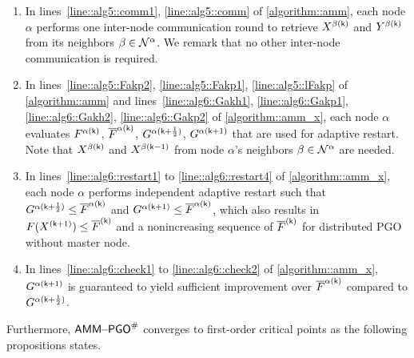 \begin{enumerate}[leftmargin=0.45cm]
	
\item In lines~\ref{line::alg5::comm1}, \ref{line::alg5::comm} of \cref{algorithm::amm}, each node $\alpha$ performs one inter-node communication round to retrieve $X^{\beta(\mathsf{k})}$ and $Y^{\beta(\mathsf{k})}$ from its neighbors $\beta\in\mathcal{N}^\alpha$. We remark that no other inter-node communication is required.

\item In lines~\ref{line::alg5::Fakp2}, \ref{line::alg5::Fakp1}, \ref{line::alg5::lFakp} of \cref{algorithm::amm} and lines~\ref{line::alg6::Gakh1}, \ref{line::alg6::Gakp1}, \ref{line::alg6::Gakh2}, \ref{line::alg6::Gakp2} of \cref{algorithm::amm_x}, each node $\alpha$  evaluates $F^{\alpha(\mathsf{k})}$, $\overline{F}^{\alpha(\mathsf{k})}$, $G^{\alpha(\mathsf{k}+\frac{1}{2})}$, $G^{\alpha(\mathsf{k}+1)}$ that are used for adaptive restart. Note that $X^{\beta(\mathsf{k})}$ and $X^{\beta(\mathsf{k}-1)}$ from node $\alpha$'s neighbors  $\beta\in\mathcal{N}^\alpha$ are needed.

\item In lines~\ref{line::alg6::restart1} to \ref{line::alg6::restart4} of \cref{algorithm::amm_x}, each node $\alpha$ performs independent adaptive restart such that $G^{\alpha(\mathsf{k}+\frac{1}{2})}\leq \overline{F}^{\alpha(\mathsf{k})}$ and $G^{\alpha(\mathsf{k}+1)}\leq \overline{F}^{\alpha(\mathsf{k})}$, which also results in $F(X^{(\mathsf{k}+1)})\leq \overline{F}^{(\mathsf{k})}$ and a nonincreasing sequence of $\overline{F}^{(\mathsf{k})}$ for distributed PGO without master node. 
\item In lines~\ref{line::alg6::check1} to \ref{line::alg6::check2} of \cref{algorithm::amm_x}, $G^{\alpha(\mathsf{k}+1)}$ is guaranteed to yield sufficient improvement over $\overline{F}^{\alpha(\mathsf{k})}$ compared to $G^{\alpha(\mathsf{k}+\frac{1}{2})}$.
\end{enumerate}
Furthermore, $\mathsf{AMM\!\!-\!\!PGO}^{\#}$  converges to first-order critical points as the following propositions states. 


%


 

